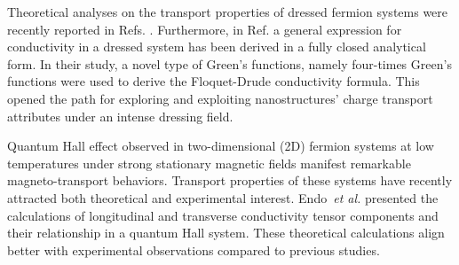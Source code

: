\documentclass[
 reprint,
 amsmath,amssymb,
 aps,
 prb,
]{revtex4-2}
\begin{document}
Theoretical analyses on the transport properties of dressed fermion systems were recently reported in Refs. \cite{kibis14,morina15,wackerl20}.
Furthermore, in Ref. \cite{wackerl20} a general expression for conductivity in a dressed system has been derived in a fully closed analytical form. In their study, a novel type of Green’s functions, namely four-times Green’s functions were used to derive the Floquet-Drude conductivity formula. This opened the path for exploring and exploiting nanostructures' charge transport attributes under an intense dressing field.

Quantum Hall effect \cite{girvin90} observed in two-dimensional (2D) fermion systems at low temperatures under strong stationary magnetic fields manifest remarkable magneto-transport behaviors. Transport properties of these systems have recently attracted both theoretical \cite{ando72,ando74_1,ando74_2,ando74_3,ando74_4,ando82,endo09} and experimental \cite{allerman95,tieke97,pan05} interest.
Endo \textit{et al.} \cite{endo09} presented the calculations of longitudinal and transverse conductivity tensor components and their relationship in a quantum Hall system. These theoretical calculations  align better with experimental observations compared to previous studies.
\end{document}
